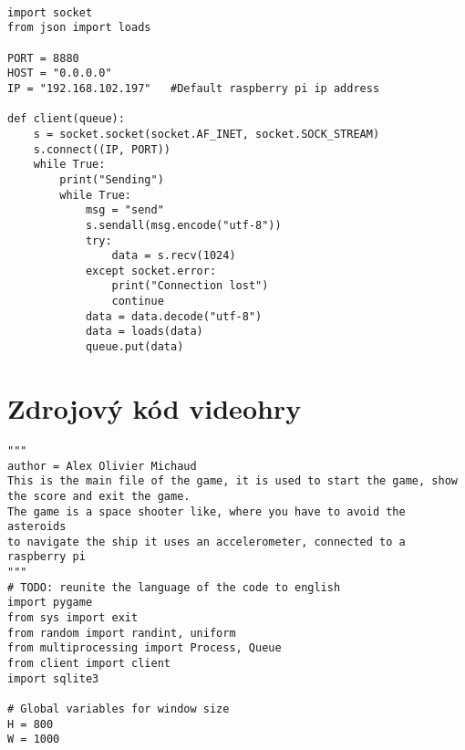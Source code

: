 \documentclass[12pt]{report}			%
\begin{document}
\begin{appendices}
\begin{lstlisting}[title={Program client.py}, caption={client.py},  label={lst:client}]

import socket
from json import loads

PORT = 8880
HOST = "0.0.0.0"
IP = "192.168.102.197"   #Default raspberry pi ip address

def client(queue):
    s = socket.socket(socket.AF_INET, socket.SOCK_STREAM)
    s.connect((IP, PORT))
    while True:
        print("Sending")
        while True:
            msg = "send"
            s.sendall(msg.encode("utf-8"))
            try:
                data = s.recv(1024)
            except socket.error:
                print("Connection lost")
                continue
            data = data.decode("utf-8")
            data = loads(data)
            queue.put(data)

\end{lstlisting}
	\chapter{Zdrojový kód videohry}
	
\begin{lstlisting}[title={Program hra.py}, caption={hra.py},  label={lst:hra}]
"""
author = Alex Olivier Michaud
This is the main file of the game, it is used to start the game, show the score and exit the game.
The game is a space shooter like, where you have to avoid the asteroids
to navigate the ship it uses an accelerometer, connected to a raspberry pi
"""
# TODO: reunite the language of the code to english
import pygame
from sys import exit
from random import randint, uniform
from multiprocessing import Process, Queue
from client import client
import sqlite3

# Global variables for window size
H = 800
W = 1000


\end{lstlisting}
\end{appendices}
\end{document}
